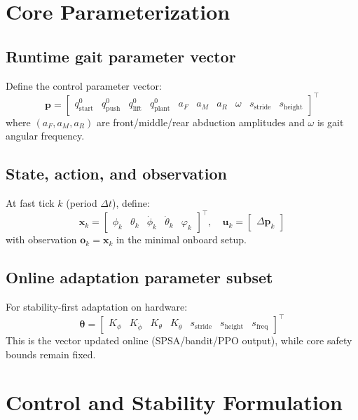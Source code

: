 \documentclass[11pt]{article}
\begin{document}
\section{Core Parameterization}

\subsection*{Runtime gait parameter vector}

Define the control parameter vector:
\[
\mathbf{p}=
\begin{bmatrix}
q^0_{\mathrm{start}} & q^0_{\mathrm{push}} & q^0_{\mathrm{lift}} & q^0_{\mathrm{plant}} &
a_F & a_M & a_R & \omega &
s_{\mathrm{stride}} & s_{\mathrm{height}}
\end{bmatrix}^{\top}
\]
where $(a_F,a_M,a_R)$ are front/middle/rear abduction amplitudes and $\omega$ is gait angular frequency.

\subsection*{State, action, and observation}

At fast tick $k$ (period $\Delta t$), define:
\[
\mathbf{x}_k=
\begin{bmatrix}
\phi_k & \theta_k & \dot{\phi}_k & \dot{\theta}_k & \varphi_k
\end{bmatrix}^{\top},\quad
\mathbf{u}_k=
\begin{bmatrix}
\Delta \mathbf{p}_k
\end{bmatrix}
\]
with observation $\mathbf{o}_k=\mathbf{x}_k$ in the minimal onboard setup.

\subsection*{Online adaptation parameter subset}

For stability-first adaptation on hardware:
\[
\boldsymbol{\theta}=
\begin{bmatrix}
K_{\phi} & K_{\dot{\phi}} & K_{\theta} & K_{\dot{\theta}} &
s_{\mathrm{stride}} & s_{\mathrm{height}} & s_{\mathrm{freq}}
\end{bmatrix}^{\top}
\]
This is the vector updated online (SPSA/bandit/PPO output), while core safety bounds remain fixed.

\section{Control and Stability Formulation}
\end{document}
